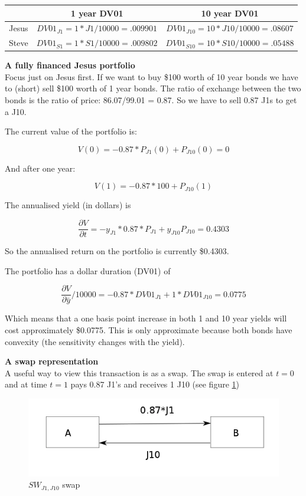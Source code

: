 \begin{center}
\begin{tabular}{|c|c|c|}
\hline
 & 1 year DV01 & 10 year DV01\\
 \hline
 Jesus & $DV01_{J1} = 1*J1/10000 = .009901$  & $DV01_{J10} = 10*J10/10000 =  .08607$\\
 Steve & $DV01_{S1} = 1*S1/10000 = .009802$  & $DV01_{S10} =10*S10/10000 = .05488$\\
 \hline
 \end{tabular}
 \end{center}

\textbf{A fully financed Jesus portfolio}\\
Focus just on Jesus first.  If we want to buy \$100 worth of 10 year bonds we have to (short) sell \$100 worth of 1 year bonds. The ratio of exchange between the two bonds is the ratio of price: 86.07/99.01 = 0.87. So we have to sell 0.87 J1s to get a J10. 

The current value of the portfolio is:

\[V(0) = -0.87*P_{J1}(0)+P_{J10}(0) = 0 \]

And after one year:

\[V(1) = -0.87*100 + P_{J10}(1)  \]

The annualised yield (in dollars) is

\[\frac{\partial V}{\partial t} = -y_{J1}*0.87*P_{J1}+y_{J10}P_{J10} = 0.4303  \]

So the annualised return on the portfolio is currently \$0.4303. 

The portfolio has a dollar duration (DV01) of 

\[ \frac{\partial V}{\partial \bar{y} }/10000= -0.87*DV01_{J1}+1*DV01_{J10} = 0.0775  \]

Which means that a one basis point increase in both 1 and 10 year yields will cost approximately \$0.0775. This is only approximate because both bonds have convexity (the sensitivity changes with the yield). %

\textbf{A swap representation}\\
A useful way to view this transaction is as a swap. The swap is entered at $t=0$ and at time $t=1$ pays 0.87 J1's and receives 1 J10 (see figure \ref{fig:durationSwap})

\begin{figure}[ht]
\centering
  \includegraphics[width=5in] {pics/durationSwap}
\caption{$SW_{J1,J10}$ swap}
\label{fig:durationSwap}
\end{figure}

